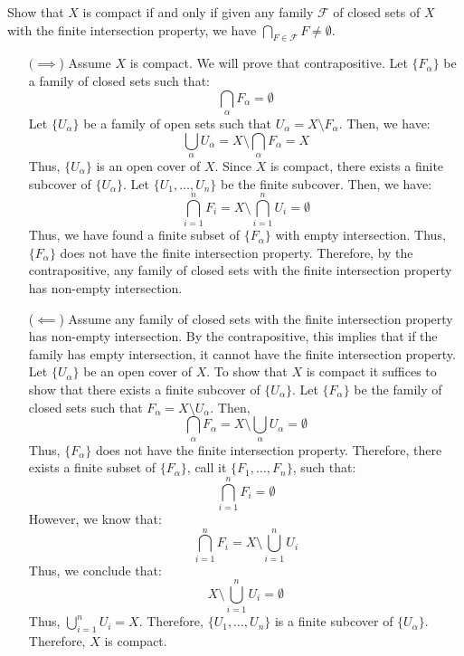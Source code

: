 \documentclass[12pt]{article}
\begin{document}


\begin{problem}{1}
    Show that $X$ is compact if and only if given any family $\mathcal{F}$ of closed sets of $X$ with the finite intersection property, we have $\bigcap_{F \in \mathcal{F}} F \neq \emptyset$.
\end{problem}
\begin{solution}
    \bbni
    \begin{itemize}
        \item[$(\implies$)] Assume $X$ is compact. We will prove that contrapositive. Let $\{F_\alpha\}$ be a family of closed sets such that: 
        \[ \bigcap_{\alpha} F_\alpha = \emptyset \]
        Let $\{U_\alpha\}$ be a family of open sets such that $U_\alpha = X \setminus F_\alpha$. Then, we have:
        \[ \bigcup_\alpha U_\alpha = X \setminus \bigcap_\alpha F_\alpha = X\]
        Thus, $\{U_\alpha\}$ is an open cover of $X$. Since $X$ is compact, there exists a finite subcover of $\{U_\alpha\}$. Let $\{U_1, \ldots, U_n\}$ be the finite subcover. Then, we have:
        \[ \bigcap_{i=1}^n F_i = X \setminus \bigcap_{i=1}^n U_i = \emptyset\]
        Thus, we have found a finite subset of $\{F_\alpha\}$ with empty intersection. Thus, $\{F_\alpha\}$ does not have the finite intersection property. Therefore, by the contrapositive, any family of closed sets with the finite intersection property has non-empty intersection.
        \item[($\impliedby$)] Assume any family of closed sets with the finite intersection property has non-empty intersection. By the contrapositive, this implies that if the family has empty intersection, it cannot have the finite intersection property. \bbni 
        Let $\{U_\alpha\}$ be an open cover of $X$. To show that $X$ is compact it suffices to show that there exists a finite subcover of $\{U_\alpha\}$. Let $\{F_\alpha\}$ be the family of closed sets such that $F_\alpha = X \setminus U_\alpha$. Then, 
        \[ \bigcap_{\alpha} F_\alpha = X \setminus \bigcup_\alpha U_\alpha  = \emptyset \]
        Thus, $\{F_\alpha\}$ does not have the finite intersection property. Therefore, there exists a finite subset of $\{F_\alpha\}$, call it $\{F_1, \ldots, F_n\}$, such that: 
        \[ \bigcap_{i = 1}^n F_i = \emptyset \]
        However, we know that:
        \[ \bigcap_{i = 1}^n F_i = X \setminus \bigcup_{i=1}^n U_i \]
        Thus, we conclude that:
        \[X \setminus \bigcup_{i=1}^n U_i = \emptyset\]
        Thus, $\bigcup_{i=1}^n U_i = X$. Therefore, $\{U_1, \ldots, U_n\}$ is a finite subcover of $\{U_\alpha\}$. Therefore, $X$ is compact.
    \end{itemize}
\end{solution}
\end{document}
